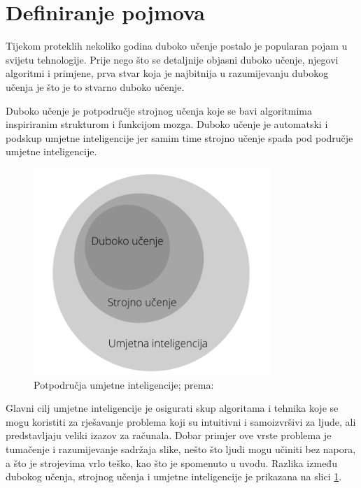 \documentclass[]{foi} %
\begin{document}
\newpage
\section{Definiranje pojmova}

Tijekom proteklih nekoliko godina duboko učenje postalo je popularan pojam u svijetu tehnologije. Prije nego što se detaljnije objasni duboko učenje, njegovi algoritmi i primjene, prva stvar koja je najbitnija u razumijevanju dubokog učenja je što je to stvarno duboko učenje.

Duboko učenje \cite{builtin1} je potpodručje strojnog učenja koje se bavi algoritmima inspiriranim strukturom i funkcijom mozga. Duboko učenje je automatski i podskup umjetne inteligencije jer samim time strojno učenje spada pod područje umjetne inteligencije.

\vspace{10mm}
\begin{figure}[!ht]
    \centering
    \includegraphics[width=0.8\textwidth]{slike/podjela.png}
    \caption{Potpodručja umjetne inteligencije; prema: \cite{builtin1}}
    \label{fig:podjela}
\end{figure}
\vspace{10mm}

Glavni cilj \cite{builtin1} umjetne inteligencije je osigurati skup algoritama i tehnika koje se mogu koristiti za rješavanje problema koji su intuitivni i samoizvršivi za ljude, ali predstavljaju veliki izazov za računala. Dobar primjer ove vrste problema je tumačenje i razumijevanje sadržaja slike, nešto što ljudi mogu učiniti bez napora, a što je strojevima vrlo teško, kao što je spomenuto u uvodu. Razlika između dubokog učenja, strojnog učenja i umjetne inteligencije je prikazana na slici \ref{fig:podjela}.
\end{document}
